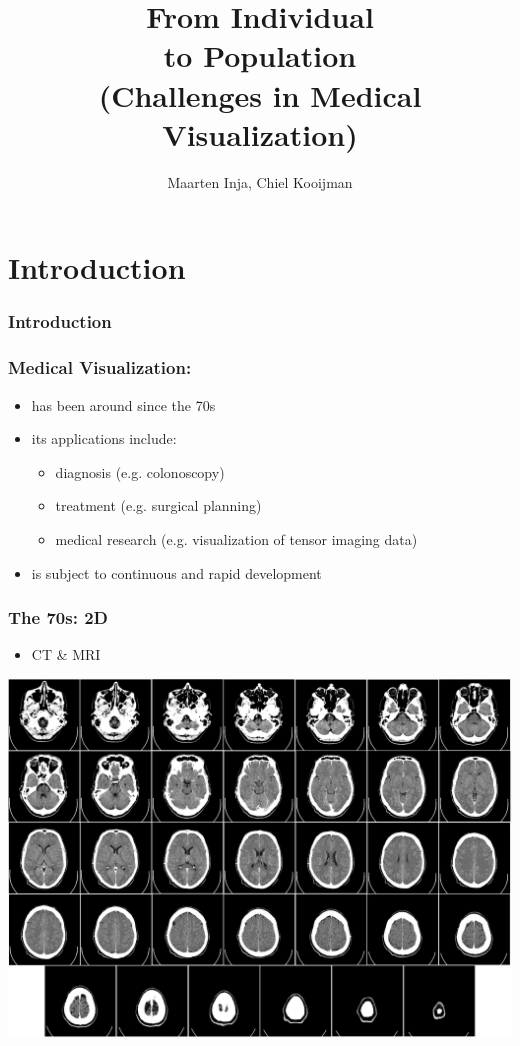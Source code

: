 \documentclass{beamer}
\title{From Individual\\to Population\\\Large (Challenges in Medical Visualization)}
\author{Maarten Inja, Chiel Kooijman}
\begin{document}
\begin{frame}
	\maketitle
\end{frame}

\section{Introduction}

\begin{frame}
	\frametitle{Introduction}
	\tableofcontents
\end{frame}

\begin{frame}
	\frametitle{Medical Visualization:}
	\begin{itemize}
		\item has been around since the 70s
		\item its applications include:
			\begin{itemize}
				\item diagnosis (e.g. colonoscopy)
				\item treatment (e.g. surgical planning)
				\item medical research (e.g. visualization of tensor imaging data)
			\end{itemize}
		\item is subject to continuous and rapid development
	\end{itemize}
\end{frame}

\begin{frame}
	\frametitle{The 70s: 2D}
	\begin{itemize}
		\item CT \& MRI
	\end{itemize}
	\begin{center}
		\includegraphics[width=.6\textwidth]{images/ct}
	\end{center}
\end{frame}
\end{document}
